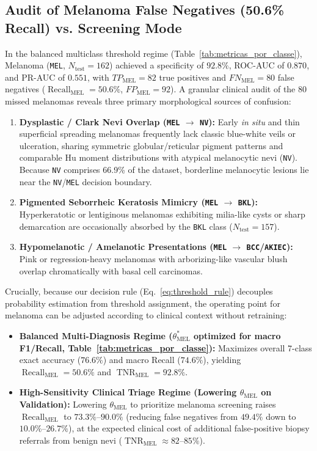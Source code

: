 \documentclass[11pt,a4paper]{article}
\begin{document}
\subsection{Audit of Melanoma False Negatives (50.6\% Recall) vs. Screening Mode}
In the balanced multiclass threshold regime (Table~\ref{tab:metricas_por_classe}), Melanoma (\texttt{MEL}, $N_{\text{test}} = 162$) achieved a specificity of $92.8\%$, ROC-AUC of $0.870$, and PR-AUC of $0.551$, with $TP_{\text{MEL}} = 82$ true positives and $FN_{\text{MEL}} = 80$ false negatives ($\operatorname{Recall}_{\text{MEL}} = 50.6\%$, $FP_{\text{MEL}} = 92$). A granular clinical audit of the $80$ missed melanomas reveals three primary morphological sources of confusion:
\begin{enumerate}
    \item \textbf{Dysplastic / Clark Nevi Overlap (\texttt{MEL} $\to$ \texttt{NV}):} Early \textit{in situ} and thin superficial spreading melanomas frequently lack classic blue-white veils or ulceration, sharing symmetric globular/reticular pigment patterns and comparable Hu moment distributions with atypical melanocytic nevi (\texttt{NV}). Because \texttt{NV} comprises 66.9\% of the dataset, borderline melanocytic lesions lie near the \texttt{NV}/\texttt{MEL} decision boundary.
    \item \textbf{Pigmented Seborrheic Keratosis Mimicry (\texttt{MEL} $\to$ \texttt{BKL}):} Hyperkeratotic or lentiginous melanomas exhibiting milia-like cysts or sharp demarcation are occasionally absorbed by the \texttt{BKL} class ($N_{\text{test}}=157$).
    \item \textbf{Hypomelanotic / Amelanotic Presentations (\texttt{MEL} $\to$ \texttt{BCC}/\texttt{AKIEC}):} Pink or regression-heavy melanomas with arborizing-like vascular blush overlap chromatically with basal cell carcinomas.
\end{enumerate}

Crucially, because our decision rule (Eq.~\ref{eq:threshold_rule}) decouples probability estimation from threshold assignment, the operating point for melanoma can be adjusted according to clinical context without retraining:
\begin{itemize}
    \item \textbf{Balanced Multi-Diagnosis Regime ($\theta_{\text{MEL}}^*$ optimized for macro F1/Recall, Table~\ref{tab:metricas_por_classe}):} Maximizes overall 7-class exact accuracy ($76.6\%$) and macro Recall ($74.6\%$), yielding $\operatorname{Recall}_{\text{MEL}} = 50.6\%$ and $\operatorname{TNR}_{\text{MEL}} = 92.8\%$.
    \item \textbf{High-Sensitivity Clinical Triage Regime (Lowering $\theta_{\text{MEL}}$ on Validation):} Lowering $\theta_{\text{MEL}}$ to prioritize melanoma screening raises $\operatorname{Recall}_{\text{MEL}}$ to $\mathbf{73.3\%\text{--}90.0\%}$ (reducing false negatives from $49.4\%$ down to $10.0\%\text{--}26.7\%$), at the expected clinical cost of additional false-positive biopsy referrals from benign nevi ($\operatorname{TNR}_{\text{MEL}} \approx 82\text{--}85\%$).
\end{itemize}
\end{document}
